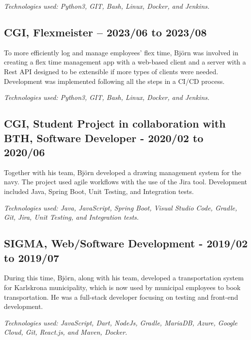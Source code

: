 \begin{minipage}[t]{0.7\textwidth}
\vspace{5pt}\textit{Technologies used: Python3, GIT, Bash, Linux, Docker, and Jenkins.}

\vspace{15pt} %

\subsection*{\textcolor{colorTitelErfarenhet}{CGI, Flexmeister – 2023/06 to 2023/08}}
To more efficiently log and manage employees' flex time, Björn was involved in creating a flex time management app with a web-based client and a server with a Rest API designed to be extensible if more types of clients were needed. Development was implemented following all the steps in a CI/CD process.

\vspace{5pt}\textit{Technologies used: Python3, GIT, Bash, Linux, Docker, and Jenkins.}

\vspace{15pt} %
\subsection*{\textcolor{colorTitelErfarenhet}{CGI, Student Project in collaboration with BTH, Software Developer - 2020/02 to 2020/06}}
Together with his team, Björn developed a drawing management system for the navy. The project used agile workflows with the use of the Jira tool. Development included Java, Spring Boot, Unit Testing, and Integration tests.

\vspace{5pt}\textit{Technologies used: Java, JavaScript, Spring Boot, Visual Studio Code, Gradle, Git, Jira, Unit Testing, and Integration tests.} 

\vspace{15pt} %
\subsection*{\textcolor{colorTitelErfarenhet}{SIGMA, Web/Software Development - 2019/02 to 2019/07}}
During this time, Björn, along with his team, developed a transportation system for Karlskrona municipality, which is now used by municipal employees to book transportation. He was a full-stack developer focusing on testing and front-end development.

\vspace{5pt}\textit{Technologies used: JavaScript, Dart, NodeJs, Gradle, MariaDB, Azure, Google Cloud, Git, React.js, and Maven, Docker.} 
\end{minipage}%
